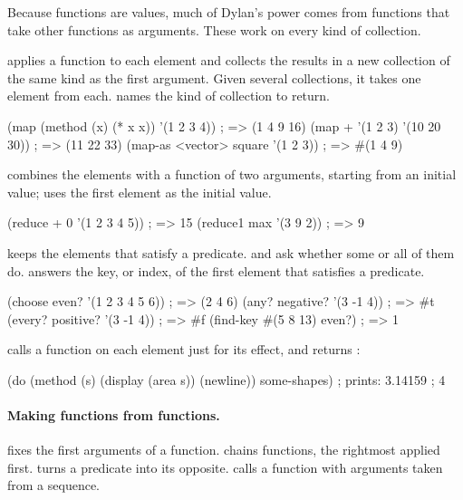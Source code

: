 Because functions are values, much of Dylan's power comes from functions
that take other functions as arguments. These work on every kind of
collection.

 applies a function to each element and collects the results in
a new collection of the same kind as the first argument. Given several
collections, it takes one element from each.  names the kind
of collection to return.

\begin{dylan}
(map (method (x) (* x x)) '(1 2 3 4))   ; => (1 4 9 16)
(map + '(1 2 3) '(10 20 30))            ; => (11 22 33)
(map-as <vector> square '(1 2 3))       ; => #(1 4 9)
\end{dylan}

 combines the elements with a function of two arguments,
starting from an initial value;  uses the first element as
the initial value.

\begin{dylan}
(reduce + 0 '(1 2 3 4 5))       ; => 15
(reduce1 max '(3 9 2))          ; => 9
\end{dylan}

 keeps the elements that satisfy a predicate.
 and  ask whether some or all of them do.
 answers the key, or index, of the first element that
satisfies a predicate.

\begin{dylan}
(choose even? '(1 2 3 4 5 6))   ; => (2 4 6)
(any? negative? '(3 -1 4))      ; => #t
(every? positive? '(3 -1 4))    ; => #f
(find-key #(5 8 13) even?)      ; => 1
\end{dylan}

 calls a function on each element just for its effect, and
returns :

\begin{dylan}
(do (method (s) (display (area s)) (newline)) some-shapes)
; prints: 3.14159
;         4
\end{dylan}

\paragraph{Making functions from functions.}
 fixes the first arguments of a function. 
chains functions, the rightmost applied first.  turns a
predicate into its opposite.  calls a function with arguments
taken from a sequence.

